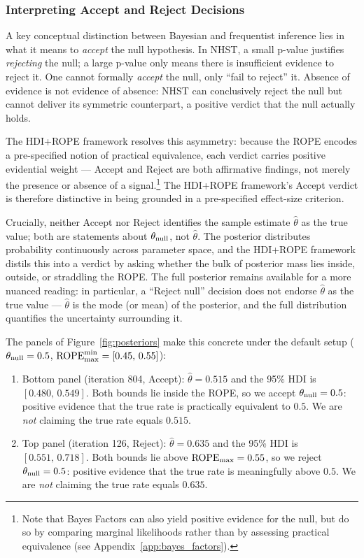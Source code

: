 \subsubsection{Interpreting Accept and Reject Decisions}\label{sec:accept_reject_meaning}

A key conceptual distinction between Bayesian and frequentist inference lies in what it
means to \textit{accept} the null hypothesis. In NHST, a small p-value justifies
\textit{rejecting} the null; a large p-value only means there is insufficient evidence
to reject it. One cannot formally \textit{accept} the null, only ``fail to reject'' it.
Absence of evidence is not evidence of absence: NHST can conclusively reject
the null but cannot deliver its symmetric counterpart, a positive verdict that
the null actually holds.

The HDI+ROPE framework resolves this asymmetry: because the ROPE encodes a pre-specified
notion of practical equivalence, each verdict carries positive evidential weight ---
Accept and Reject are both affirmative findings, not merely the presence or absence of a
signal.\footnote{Note that Bayes Factors can also yield positive evidence for the null, but do so
by comparing marginal likelihoods rather than by assessing practical equivalence
(see Appendix~\ref{app:bayes_factors}).} The HDI+ROPE framework's Accept verdict is therefore
distinctive in being grounded in a pre-specified effect-size criterion.

Crucially, neither Accept nor Reject identifies the sample estimate $\hat\theta$ as the
true value; both are statements about $\theta_{\rm null}$, not $\hat\theta$. The posterior
distributes probability continuously across parameter space, and the HDI+ROPE framework distils
this into a verdict by asking whether the bulk of posterior mass lies inside, outside, or
straddling the ROPE. The full posterior remains available for a more nuanced reading: in
particular, a ``Reject null'' decision does not endorse $\hat\theta$ as the true value
--- $\hat\theta$ is the mode (or mean) of the posterior, and the full distribution
quantifies the uncertainty surrounding it.

The panels of Figure~\ref{fig:posteriors} make this concrete under the default setup
($\theta_{\rm null}=0.5$, $\mathrm{ROPE}_{\rm max}^{\rm min}=[0.45,\,0.55]$):

\begin{enumerate}[label=(\alph*)]
  \item Bottom panel (iteration 804, Accept):
        $\hat\theta=0.515$ and the 95\% HDI is
        $[0.480,\,0.549]$.
        Both bounds lie inside the ROPE, so we accept
        $\theta_{\rm null}=0.5$: positive evidence that the true rate is practically
        equivalent to $0.5$. We are \textit{not} claiming the true rate equals $0.515$.
  \item Top panel (iteration 126, Reject):
        $\hat\theta=0.635$ and the 95\% HDI is
        $[0.551,\,0.718]$.
        Both bounds lie above $\mathrm{ROPE}_{\rm max}=0.55$, so we reject
        $\theta_{\rm null}=0.5$: positive evidence that the true rate is meaningfully
        above $0.5$. We are \textit{not} claiming the true rate equals $0.635$.
\end{enumerate}

